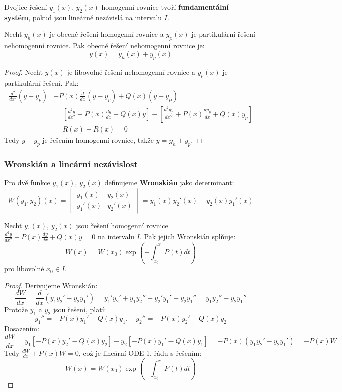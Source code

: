 \begin{definition}
Dvojice řešení $y_1(x)$, $y_2(x)$ homogenní rovnice tvoří \textbf{fundamentální systém}, pokud jsou lineárně nezávislá na intervalu $I$.
\end{definition}

\begin{theorem}
Nechť $y_h(x)$ je obecné řešení homogenní rovnice a $y_p(x)$ je partikulární řešení nehomogenní rovnice. Pak obecné řešení nehomogenní rovnice je:
\[
y(x) = y_h(x) + y_p(x)
\]
\end{theorem}

\begin{proof}
Nechť $y(x)$ je libovolné řešení nehomogenní rovnice a $y_p(x)$ je partikulární řešení. Pak:
\begin{align*}
\frac{d^2}{dx^2}(y - y_p) &+ P(x)\frac{d}{dx}(y - y_p) + Q(x)(y - y_p) \\
&= \left[\frac{d^2y}{dx^2} + P(x)\frac{dy}{dx} + Q(x)y\right] - \left[\frac{d^2y_p}{dx^2} + P(x)\frac{dy_p}{dx} + Q(x)y_p\right] \\
&= R(x) - R(x) = 0
\end{align*}
Tedy $y - y_p$ je řešením homogenní rovnice, takže $y = y_h + y_p$.
\end{proof}

\subsubsection{Wronskián a lineární nezávislost}
\label{subsubsec:wronskian}

\begin{definition}[Wronskián]
Pro dvě funkce $y_1(x)$, $y_2(x)$ definujeme \textbf{Wronskián} jako determinant:
\[
W(y_1, y_2)(x) = \begin{vmatrix}
y_1(x) & y_2(x) \\
y_1'(x) & y_2'(x)
\end{vmatrix} = y_1(x)y_2'(x) - y_2(x)y_1'(x)
\]
\end{definition}

\begin{theorem}
Nechť $y_1(x)$, $y_2(x)$ jsou řešení homogenní rovnice $\frac{d^2y}{dx^2} + P(x)\frac{dy}{dx} + Q(x)y = 0$ na intervalu $I$. Pak jejich Wronskián splňuje:
\[
W(x) = W(x_0) \exp\left(-\int_{x_0}^x P(t) dt\right)
\]
pro libovolné $x_0 \in I$.
\end{theorem}

\begin{proof}
Derivujeme Wronskián:
\[
\frac{dW}{dx} = \frac{d}{dx}(y_1y_2' - y_2y_1') = y_1'y_2' + y_1y_2'' - y_2'y_1' - y_2y_1'' = y_1y_2'' - y_2y_1''
\]
Protože $y_1$ a $y_2$ jsou řešení, platí:
\[
y_1'' = -P(x)y_1' - Q(x)y_1, \quad y_2'' = -P(x)y_2' - Q(x)y_2
\]
Dosazením:
\[
\frac{dW}{dx} = y_1[-P(x)y_2' - Q(x)y_2] - y_2[-P(x)y_1' - Q(x)y_1] = -P(x)(y_1y_2' - y_2y_1') = -P(x)W
\]
Tedy $\frac{dW}{dx} + P(x)W = 0$, což je lineární ODE 1. řádu s řešením:
\[
W(x) = W(x_0) \exp\left(-\int_{x_0}^x P(t) dt\right)
\]
\end{proof}

